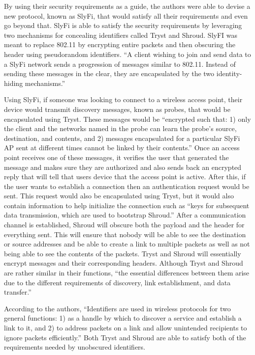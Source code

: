 By using their security requirements as a guide, the authors were able to devise a new protocol, known as SlyFi, that would satisfy all their requirements and even go beyond that. SlyFi is able to satisfy the security requirements by leveraging two mechanisms for concealing identifiers called Tryst and Shroud. SlyFI was meant to replace 802.11 by encrypting entire packets and then obscuring the header using pseudorandom identifiers. “A client wishing to join and send data to a SlyFi network sends a progression of messages similar to 802.11. Instead of sending these messages in the clear, they are encapsulated by the two identity-hiding mechanisms.” \cite {greenstein2008improving} 

\smallskip

Using SlyFi, if someone was looking to connect to a wireless access point, their device would transmit discovery messages, known as probes, that would be encapsulated using Tryst. These messages would be “encrypted such that: 1) only the client and the networks named in the probe can learn the probe’s source, destination, and contents, and 2) messages encapsulated for a particular SlyFi AP sent at different times cannot be linked by their contents.” \cite {greenstein2008improving} Once an access point receives one of these messages, it verifies the user that generated the message and makes sure they are authorized and also sends back an encrypted reply that will tell that users device that the access point is active. After this, if the user wants to establish a connection then an authentication request would be sent. This request would also be encapsulated using Tryst, but it would also contain information to help initialize the connection such as “keys for subsequent data transmission, which are used to bootstrap Shroud.” \cite {greenstein2008improving} After a communication channel is established, Shroud will obscure both the payload and the header for everything sent. This will ensure that nobody will be able to see the destination or source addresses and be able to create a link to multiple packets as well as not being able to see the contents of the packets. Tryst and Shroud will essentially encrypt messages and their corresponding headers. Although Tryst and Shroud are rather similar in their functions, “the essential differences between them arise due to the different requirements of discovery, link establishment, and data transfer.” \cite {greenstein2008improving}

\smallskip

According to the authors, “Identifiers are used in wireless protocols for two general functions: 1) as a handle by which to discover a service and establish a link to it, and 2) to address packets on a link and allow unintended recipients to ignore packets efficiently.” \cite {greenstein2008improving} Both Tryst and Shroud are able to satisfy both of the requirements needed by unobscured identifiers. 

